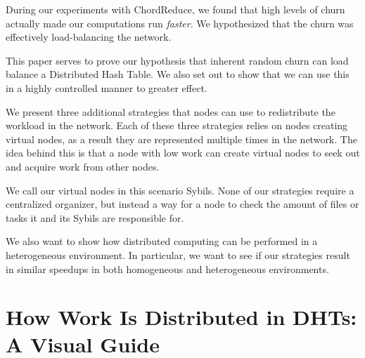 \documentclass[11pt,conference]{IEEEtran}
\begin{document}
During our experiments with ChordReduce, we found that high levels of churn actually made our computations run \textit{faster}.
We hypothesized that the churn was effectively load-balancing the network.

This paper serves to prove our hypothesis that inherent random churn can load balance a Distributed Hash Table.
We also set out to show that we can use this in a highly controlled manner to greater effect.

We present three additional strategies that nodes can use to redistribute the workload in the network.
Each of these three strategies relies on nodes creating virtual nodes, as a result they are represented multiple times in the network.
The idea behind this is that a node with low work can create virtual nodes to seek out and acquire work from other nodes.

We call our virtual nodes in this scenario Sybils.
None of our strategies require a centralized organizer, but instead a way for a node to check the amount of files or tasks it and its Sybils are responsible for.


We also want to show how distributed computing can be performed in a heterogeneous environment.
In particular, we want to see if our strategies result in similar speedups in both homogeneous and heterogeneous environments.

%
%

\section{How Work Is Distributed in DHTs: A Visual Guide}
\end{document}
